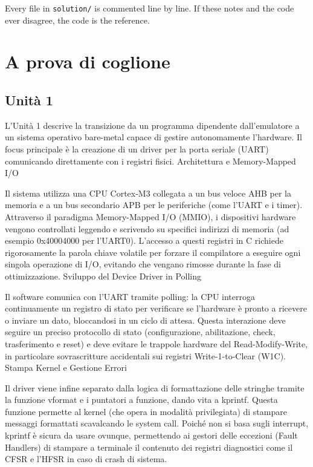 Every file in \texttt{solution/} is commented line by line. If these notes and the code ever disagree, the code is the reference.


\section{A prova di coglione}
\subsection{Unità 1}
L'Unità 1 descrive la transizione da un programma dipendente dall'emulatore a un sistema operativo bare-metal capace di gestire autonomamente l'hardware. Il focus principale è la creazione di un driver per la porta seriale (UART) comunicando direttamente con i registri fisici.   Architettura e Memory-Mapped I/O

Il sistema utilizza una CPU Cortex-M3 collegata a un bus veloce AHB per la memoria e a un bus secondario APB per le periferiche (come l'UART e i timer). Attraverso il paradigma Memory-Mapped I/O (MMIO), i dispositivi hardware vengono controllati leggendo e scrivendo su specifici indirizzi di memoria (ad esempio 0x40004000 per l'UART0). L'accesso a questi registri in C richiede rigorosamente la parola chiave volatile per forzare il compilatore a eseguire ogni singola operazione di I/O, evitando che vengano rimosse durante la fase di ottimizzazione.   Sviluppo del Device Driver in Polling

Il software comunica con l'UART tramite polling: la CPU interroga continuamente un registro di stato per verificare se l'hardware è pronto a ricevere o inviare un dato, bloccandosi in un ciclo di attesa. Questa interazione deve seguire un preciso protocollo di stato (configurazione, abilitazione, check, trasferimento e reset) e deve evitare le trappole hardware del Read-Modify-Write, in particolare sovrascritture accidentali sui registri Write-1-to-Clear (W1C).   Stampa Kernel e Gestione Errori

Il driver viene infine separato dalla logica di formattazione delle stringhe tramite la funzione vformat e i puntatori a funzione, dando vita a kprintf. Questa funzione permette al kernel (che opera in modalità privilegiata) di stampare messaggi formattati scavalcando le system call. Poiché non si basa sugli interrupt, kprintf è sicura da usare ovunque, permettendo ai gestori delle eccezioni (Fault Handlers) di stampare a terminale il contenuto dei registri diagnostici come il CFSR e l'HFSR in caso di crash di sistema. 

